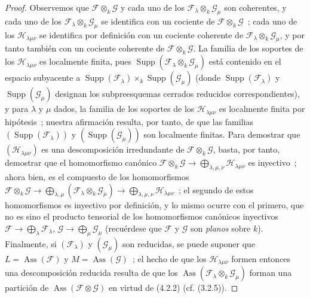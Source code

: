 \begin{proof}
Observemos que $\mathcal F\otimes_k\mathcal G$ y cada uno de los
$\mathcal F_\lambda\otimes_k\mathcal G_\mu$ son coherentes, y cada uno de los
$\mathcal F_\lambda\otimes_k\mathcal G_\mu$ se identifica con un cociente de
$\mathcal F\otimes_k\mathcal G$~; cada uno de los
$\mathcal H_{\lambda\mu\nu}$ se identifica por definición con un cociente
coherente de $\mathcal F_\lambda\otimes_k\mathcal G_\mu$, y por tanto también
con un cociente coherente de $\mathcal F\otimes_k\mathcal G$. La familia de
los soportes de los $\mathcal H_{\lambda\mu\nu}$ es localmente finita, pues
$\operatorname{Supp}(\mathcal F_\lambda\otimes_k\mathcal G_\mu)$ está contenido
en el espacio subyacente a
$\operatorname{Supp}(\mathcal F_\lambda)\times_k
\operatorname{Supp}(\mathcal G_\mu)$ (donde
$\operatorname{Supp}(\mathcal F_\lambda)$ y
$\operatorname{Supp}(\mathcal G_\mu)$ designan los subpreesquemas cerrados
reducidos correspondientes), y para $\lambda$ y $\mu$ dados, la familia de los
soportes de los $\mathcal H_{\lambda\mu\nu}$ es localmente finita por
hipótesis~; nuestra afirmación resulta, por tanto, de que las familias
$(\operatorname{Supp}(\mathcal F_\lambda))$ y
$(\operatorname{Supp}(\mathcal G_\mu))$ son localmente finitas. Para demostrar
que $(\mathcal H_{\lambda\mu\nu})$ es una descomposición irredundante de
$\mathcal F\otimes_k\mathcal G$, basta, por tanto, demostrar que el
homomorfismo canónico
$\mathcal F\otimes_k\mathcal G
\longrightarrow\bigoplus_{\lambda,\mu,\nu}\mathcal H_{\lambda\mu\nu}$
es inyectivo~; ahora bien, es el compuesto de los homomorfismos
$\mathcal F\otimes_k\mathcal G
\longrightarrow\bigoplus_{\lambda,\mu}(\mathcal F_\lambda\otimes_k\mathcal G_\mu)
\longrightarrow\bigoplus_{\lambda,\mu,\nu}\mathcal H_{\lambda\mu\nu}$~;
el segundo de estos homomorfismos es inyectivo por definición, y lo mismo
ocurre con el primero, que no es sino el producto tensorial de los
homomorfismos canónicos inyectivos
$\mathcal F\to\bigoplus_\lambda\mathcal F_\lambda$,
$\mathcal G\to\bigoplus_\mu\mathcal G_\mu$ (recuérdese que
$\mathcal F$ y $\mathcal G$ son \emph{planos} sobre $k$). Finalmente, si
$(\mathcal F_\lambda)$ y $(\mathcal G_\mu)$ son reducidas, se puede suponer
que $L=\operatorname{Ass}(\mathcal F)$ y
$M=\operatorname{Ass}(\mathcal G)$~; el hecho de que los
$\mathcal H_{\lambda\mu\nu}$ formen entonces una descomposición reducida
resulta de que los $\operatorname{Ass}(\mathcal F_\lambda\otimes_k
\mathcal G_\mu)$ forman una partición de
$\operatorname{Ass}(\mathcal F\otimes\mathcal G)$ en virtud de (4.2.2)
(cf. (3.2.5)).
\end{proof}

